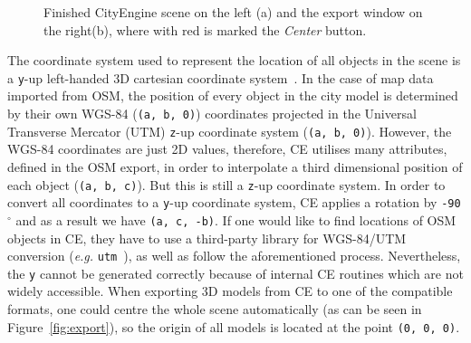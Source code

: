 \begin{figure}[htb]
	\centering
	\caption{Finished CityEngine scene on the left (a) and the export window on the right(b), where with red is marked the \emph{Center} button.}
\end{figure}

The coordinate system used to represent the location of all objects in the scene is a \texttt{y}-up left-handed 3D cartesian coordinate system~\cite{ceman}. In the case of map data imported from OSM, the position of every object in the city model is determined by their own WGS-84 (\texttt{(a, b, 0)}) coordinates projected in the Universal Transverse Mercator (UTM) \texttt{z}-up coordinate system (\texttt{(a, b, 0)}). However, the WGS-84 coordinates are just 2D values, therefore, CE utilises many attributes, defined in the OSM export, in order to interpolate a third dimensional position of each object (\texttt{(a, b, c)}). But this is still a \texttt{z}-up coordinate system. In order to convert all coordinates to a \texttt{y}-up coordinate system, CE applies a rotation by \texttt{-90$^{\circ}$} and as a result we have \texttt{(a, c, -b)}. If one would like to find locations of OSM objects in CE, they have to use a third-party library for WGS-84/UTM conversion (\emph{e.g.} \texttt{utm}~\cite{utm}), as well as follow the aforementioned process. Nevertheless, the \texttt{y} cannot be generated correctly because of internal CE routines which are not widely accessible. When exporting 3D models from CE to one of the compatible formats, one could centre the whole scene automatically (as can be seen in Figure~\ref{fig:export}), so the origin of all models is located at the point \texttt{(0, 0, 0)}.

